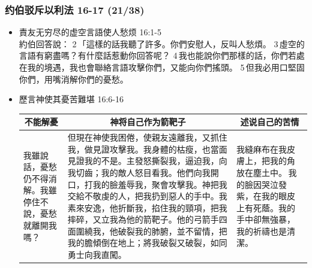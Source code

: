 \subsubsection{约伯驳斥以利法 16-17 (21/38)}
\begin{itemize}
\itemsep-.45em 
\item 責友无穷尽的虚空言語使人愁烦 16:1-5\\
約伯回答說： 2 「這樣的話我聽了許多。你們安慰人，反叫人愁煩。 3 虛空的言語有窮盡嗎？有什麼話惹動你回答呢？ 4 我也能說你們那樣的話，你們若處在我的境遇，我也會聯絡言語攻擊你們，又能向你們搖頭。 5 但我必用口堅固你們，用嘴消解你們的憂愁。
\item 歷言神使其憂苦難堪 16:6-16\\
\begin{table}[H]
\centering 
\begin{tabular}{p{}|p{}|p{}}    \toprule
\multicolumn{1}{c|}{不能解憂}&\multicolumn{1}{c|}{神将自己作为箭靶子}&\multicolumn{1}{c}{述说自己的苦情}\\\hline
我雖說話，憂愁仍不得消解。我雖停住不說，憂愁就離開我嗎？
&但現在神使我困倦，使親友遠離我，又抓住我，做見證攻擊我。我身體的枯瘦，也當面見證我的不是。主發怒撕裂我，逼迫我，向我切齒；我的敵人怒目看我。他們向我開口，打我的臉羞辱我，聚會攻擊我。神把我交給不敬虔的人，把我扔到惡人的手中。我素來安逸，他折斷我，掐住我的頸項，把我摔碎，又立我為他的箭靶子。他的弓箭手四面圍繞我，他破裂我的肺腑，並不留情，把我的膽傾倒在地上；將我破裂又破裂，如同勇士向我直闖。&我縫麻布在我皮膚上，把我的角放在塵土中。 我的臉因哭泣發紫，在我的眼皮上有死蔭。我的手中卻無強暴，我的祈禱也是清潔。\\ \bottomrule
\end{tabular} 
\end{table}


\end{itemize}
